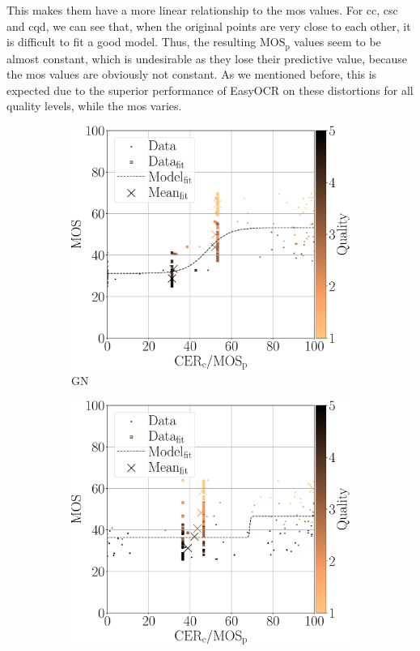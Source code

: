 This makes them have a more linear relationship to the \gls{mos} values.
For \gls{cc}, \gls{csc} and \gls{cqd}, we can see that, when the original points are very close to each other, it is difficult to fit a good model.
Thus, the resulting $\text{MOS}_{\text{p}}$ values seem to be almost constant, which is undesirable as they lose their predictive value, because the \gls{mos} values are obviously not constant.
As we mentioned before, this is expected due to the superior performance of EasyOCR on these distortions for all quality levels, while the \gls{mos} varies.
\begin{figure}
\centering
    \begin{subfigure}[b]{0.32\textwidth}
        \includegraphics[width=\textwidth]{../../images/analyze/mos_cer_ref_fitted_mean_tess_GN.pdf}
        \caption{GN}
        \label{fig:mos_cer_ref_fitted_mean_tess_GN}
    \end{subfigure}%
    \hfill
    \begin{subfigure}[b]{0.32\textwidth}
        \includegraphics[width=\textwidth]{../../images/analyze/mos_cer_ref_fitted_mean_tess_GB.pdf}

\end{subfigure}
\end{figure}
